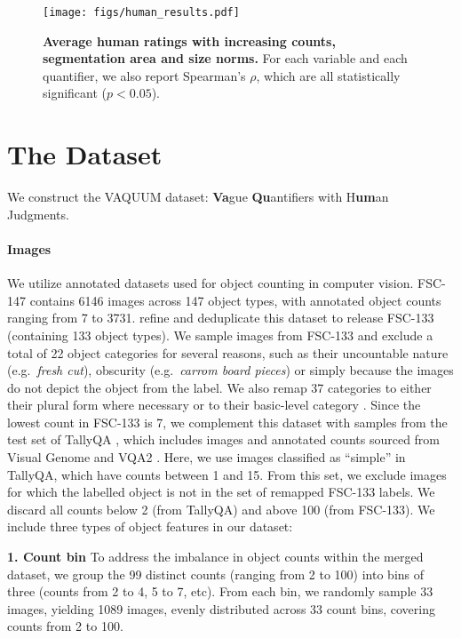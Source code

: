 \begin{figure*}[t]
    \centering
    \texttt{[image: figs/human\_results.pdf]}
    \caption{\textbf{Average human ratings with increasing counts, segmentation area and size norms.} For each variable and each quantifier, we also report Spearman's $\rho$, which are all statistically significant ($p < 0.05$).}\label{fig:human_results}
\end{figure*}


\section{The \dataset Dataset}\label{sec:dataset}
We construct the VAQUUM dataset: \textbf{Va}gue \textbf{Qu}antifiers with H\textbf{um}an Judgments. 

\paragraph{Images}
We utilize annotated datasets used for object counting in computer vision.
FSC-147 \citep{ranjan2021-fsc147} contains 6146 images across 147 object types,
with annotated object counts ranging from 7 to 3731.
\citet{hobley2022-fsc133} refine and deduplicate this dataset to release FSC-133 (containing 133 object types).
We sample images from FSC-133 and exclude a total of 22 object categories for several reasons, 
such as their uncountable nature (e.g.\ \textit{fresh cut}), 
obscurity (e.g.\ \textit{carrom board pieces}) 
or simply because the images do not depict the object from the label. 
We also remap 37 categories to either their plural form where necessary or 
to their basic-level category \cite[e.g.\ mapping \textit{crows} to \textit{birds}; cf.][]{Rosch1976}. 
Since the lowest count in FSC-133 is 7, we complement this dataset with samples from 
the test set of TallyQA \citep{acharya2019-tallyqa}, 
which includes images and annotated counts sourced from 
Visual Genome \citep{krishna2017-visualgenome} and VQA2 \citep{antol2015-vqa,goyal2017-vqa2}. 
Here, we use images classified as ``simple'' in TallyQA, 
which have counts between 1 and 15. 
From this set, we exclude images for which the labelled object is not 
in the set of remapped FSC-133 labels. 
We discard all counts below 2 (from TallyQA) and above 100 (from FSC-133). 
We include three types of object features in our dataset:

\noindent 
{\bf 1. Count bin} To address the imbalance in object counts within the merged dataset,
we group the 99 distinct counts (ranging from 2 to 100) into bins of three (counts from 2 to 4, 5 to 7, etc).
From each bin, we randomly sample 33 images, yielding
1089 images, evenly distributed across 33 count bins, covering counts from 2 to 100. 

